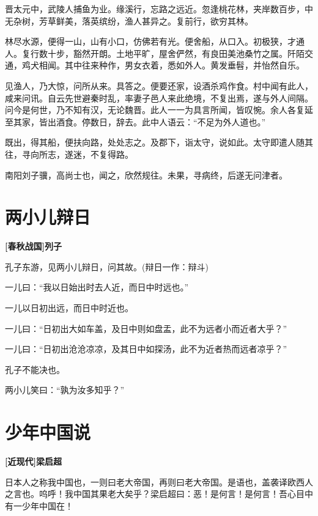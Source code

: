 \documentclass[UTF8,titlepage,oneside]{ctexbook}
\begin{document}
晋太元中，武陵人捕鱼为业。缘溪行，忘路之远近。忽逢桃花林，夹岸数百步，中无杂树，芳草鲜美，落英缤纷，渔人甚异之。复前行，欲穷其林。


林尽水源，便得一山，山有小口，仿佛若有光。便舍船，从口入。初极狭，才通人。复行数十步，豁然开朗。土地平旷，屋舍俨然，有良田美池桑竹之属。阡陌交通，鸡犬相闻。其中往来种作，男女衣着，悉如外人。黄发垂髫，并怡然自乐。


见渔人，乃大惊，问所从来。具答之。便要还家，设酒杀鸡作食。村中闻有此人，咸来问讯。自云先世避秦时乱，率妻子邑人来此绝境，不复出焉，遂与外人间隔。问今是何世，乃不知有汉，无论魏晋。此人一一为具言所闻，皆叹惋。余人各复延至其家，皆出酒食。停数日，辞去。此中人语云：“不足为外人道也。”


既出，得其船，便扶向路，处处志之。及郡下，诣太守，说如此。太守即遣人随其往，寻向所志，遂迷，不复得路。


南阳刘子骥，高尚士也，闻之，欣然规往。未果，寻病终，后遂无问津者。



\chapter*{两小儿辩日}
\begin{center}
	\textbf{[春秋战国]列子}
\end{center}

孔子东游，见两小儿辩日，问其故。(辩日一作：辩斗)

一儿曰：“我以日始出时去人近，而日中时远也。”

一儿以日初出远，而日中时近也。

一儿曰：“日初出大如车盖，及日中则如盘盂，此不为远者小而近者大乎？”

一儿曰：“日初出沧沧凉凉，及其日中如探汤，此不为近者热而远者凉乎？”

孔子不能决也。

两小儿笑曰：“孰为汝多知乎？”


\chapter*{少年中国说}
\begin{center}
	\textbf{[近现代]梁启超}
\end{center}

日本人之称我中国也，一则曰老大帝国，再则曰老大帝国。是语也，盖袭译欧西人之言也。呜呼！我中国其果老大矣乎？梁启超曰：恶！是何言！是何言！吾心目中有一少年中国在！
\end{document}
